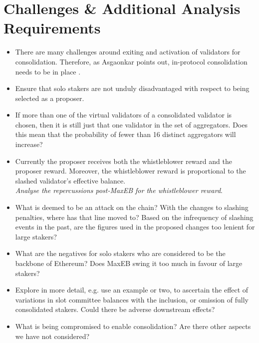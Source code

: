 \documentclass{article}
\begin{document}
\section{Challenges \& Additional Analysis Requirements}
\begin{itemize}
  \item There are many challenges around exiting and activation of validators
    for consolidation. Therefore, as Asgaonkar points out, in-protocol
    consolidation needs to be in place \cite{Asgaonkar2023}.

  \item Ensure that solo stakers are not unduly disadvantaged with respect to
  being selected as a proposer.

  \item If more than one of the virtual validators of a consolidated validator
    is chosen, then it is still just that one validator in the set of
    aggregators. Does this mean that  the probability of fewer than 16 distinct
    aggregators will increase?

  \item Currently the proposer receives both the whistleblower reward and the
    proposer reward. Moreover, the whistleblower reward is proportional to the
    slashed validator's effective balance. \\ \textit{Analyse the repercussions
    post-MaxEB for the whistleblower reward}.

  \item What is deemed to be an attack on the chain? With the changes to
    slashing penalties, where has that line moved to? Based on the infrequency
    of slashing events in the past, are the figures used in the proposed
    changes too lenient for large stakers?

  \item What are the negatives for solo stakers who are considered to be the
    backbone of Ethereum? Does MaxEB swing it too much in favour of large
    stakers?

  \item Explore in more detail, e.g. use an example or two, to ascertain the
    effect of variations in slot committee balances with the inclusion, or
    omission of fully consolidated stakers. Could there be adverse downstream
    effects?

  \item What is being compromised to enable consolidation? Are there other
    aspects we have not considered?


\end{itemize}
\end{document}
